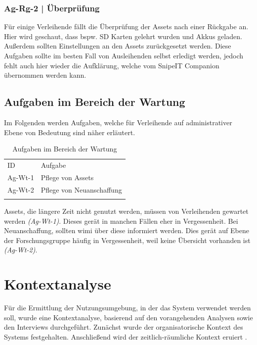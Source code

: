 \subsubsection{Ag-Rg-2 | Überprüfung}
Für einige Verleihende fällt die Überprüfung der Assets nach einer Rückgabe an. Hier wird geschaut,
dass bspw. SD Karten gelehrt wurden und Akkus geladen. Außerdem sollten Einstellungen an den Assets
zurückgesetzt werden. Diese Aufgaben sollte im besten Fall von Ausleihenden selbst erledigt werden,
jedoch fehlt auch hier wieder die Aufklärung, welche vom SnipeIT Companion übernommen werden kann.
\subsection{Aufgaben im Bereich der Wartung}
\label{subsec:wartung}
Im Folgenden werden Aufgaben, welche für Verleihende auf administrativer Ebene von Bedeutung sind
näher erläutert. 

\begin{table}[h]
    \centering
    \caption{Aufgaben im Bereich der Wartung}
    \begin{tabular}{ll}
            \arrayrulecolor{maincolor}\hline
            \sffamily\color{maincolor}ID & \sffamily\color{maincolor}Aufgabe \\
            \arrayrulecolor{maincolor}\hline
            Ag-Wt-1 & Pflege von Assets            \\
            Ag-Wt-2 & Pflege von Neuanschaffung    \\
            \arrayrulecolor{maincolor}\hline
    \end{tabular}
    \label{table:Ag-Wt}
\end{table}

Assets, die längere Zeit nicht genutzt werden, müssen von Verleihenden gewartet werden \textit{(Ag-Wt-1)}. Dieses gerät
in manchen Fällen eher in Vergessenheit. Bei Neuanschaffung, sollten \ac{wimi} über diese informiert werden. Dies gerät auf Ebene der
Forschungsgruppe häufig in Vergessenheit, weil keine Übersicht vorhanden ist \textit{(Ag-Wt-2)}.  



\section{Kontextanalyse}
\label{section:kontext}

Für die Ermittlung der Nutzungsumgebung, in der das System verwendet werden soll, wurde eine
Kontextanalyse, basierend auf den vorangehenden Analysen sowie den Interviews durchgeführt. Zunächst
wurde der organisatorische Kontext des Systems festgehalten. Anschließend wird der
zeitlich-räumliche Kontext eruiert \cite{herczeg_einfuhrung_2009}.

